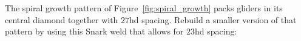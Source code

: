 \begin{multicols}{2}
	
	\mfilbreak
	
	
	\begin{problem}\label{exer:snark_spiral_weld} 
		The spiral growth pattern of Figure~\ref{fig:spiral_growth} packs gliders in its central diamond together with $27$hd spacing. Rebuild a smaller version of that pattern by using this Snark weld that allows for $23$hd spacing:
		
		\noindent\begin{center}
		\end{center}
		
	\end{problem}
	
\end{multicols}
\normalsize\vspace*{0.01cm}
